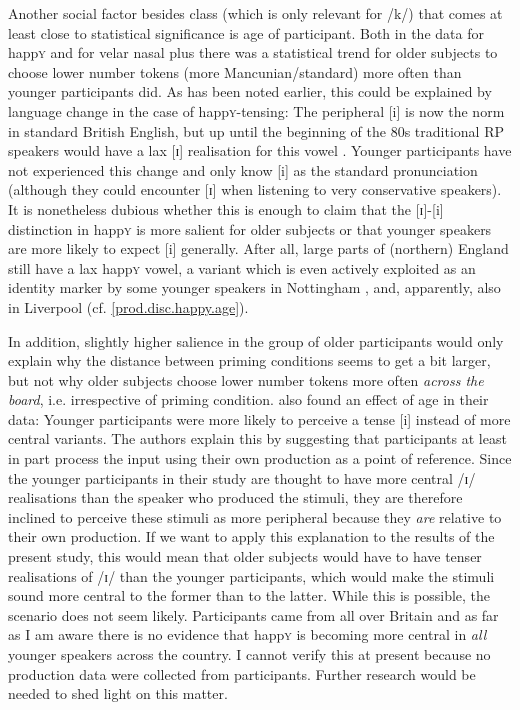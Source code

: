 Another social factor besides class (which is only relevant for /k/) that comes at least close to statistical significance is age of participant.
Both in the data for happ\textsc{y} and for velar nasal plus there was a statistical trend for older subjects to choose lower number tokens (more Mancunian/standard) more often than younger participants did.
As has been noted earlier, this could be explained by language change in the case of happ\textsc{y}-tensing: The peripheral [i] is now the norm in standard British English, but up until the beginning of the 80s traditional RP speakers would have a lax [ɪ] realisation for this vowel \parencite[cf.][]{harrington2006}.
Younger participants have not experienced this change and only know [i] as the standard pronunciation (although they could encounter [ɪ] when listening to very conservative speakers).
It is nonetheless dubious whether this is enough to claim that the [ɪ]-[i] distinction in happ\textsc{y} is more salient for older subjects or that younger speakers are more likely to expect [i] generally.
After all, large parts of (northern) England still have a lax happ\textsc{y} vowel, a variant which is even actively exploited as an identity marker by some younger speakers in Nottingham \parencite[cf.][]{flynn2010}, and, apparently, also in Liverpool (cf. \ref{prod.disc.happy.age}).

In addition, slightly higher salience in the group of older participants would only explain why the distance between priming conditions seems to get a bit larger, but not why older subjects choose lower number tokens more often \emph{across the board}, i.e. irrespective of priming condition.
\textcite[878--879]{haydrager2010} also found an effect of age in their data: Younger participants were more likely to perceive a tense [i] instead of more central variants.
The authors explain this by suggesting that participants at least in part process the input using their own production as a point of reference.
Since the younger participants in their study are thought to have more central /ɪ/ realisations than the speaker who produced the stimuli, they are therefore inclined to perceive these stimuli as more peripheral because they \emph{are} relative to their own production.
If we want to apply this explanation to the results of the present study, this would mean that older subjects would have to have tenser realisations of /ɪ/ than the younger participants, which would make the stimuli sound more central to the former than to the latter.
While this is possible, the scenario does not seem likely.
Participants came from all over Britain and as far as I am aware there is no evidence that happ\textsc{y} is becoming more central in \emph{all} younger speakers across the country.
I cannot verify this at present because no production data were collected from participants.
Further research would be needed to shed light on this matter.

